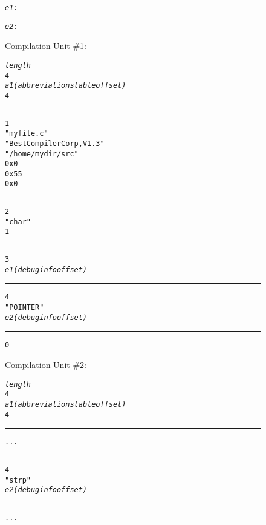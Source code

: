 \clearpage
\begin{figure}[here]
\begin{minipage}[t]{0.03\linewidth}
\flushright
\scriptsize
\begin{alltt}




















\textit{e1:}




\textit{e2:}
\end{alltt}
\end{minipage}
%
\begin{minipage}[t]{0.38\linewidth}
\centering
Compilation Unit \#1: 
\begin{framed}
\scriptsize
\begin{alltt}
\textit{length}
4
\textit{a1 (abbreviations table offset)}
4
\vspace{0.01cm}
\hrule
1
"myfile.c"
"Best Compiler Corp, V1.3"
"/home/mydir/src"
0x0
0x55
0x0
\vspace{0.01cm}
\hrule
2
"char"
1
\vspace{0.01cm}
\hrule
3
\textit{e1  (debug info offset)}
\vspace{0.01cm}
\hrule
4
"POINTER"
\textit{e2  (debug info offset)}
\vspace{0.01cm}
\hrule
0
\end{alltt}
%
%
\end{framed}
Compilation Unit \#2: 
\begin{framed}
\scriptsize
\begin{alltt}
\textit{length}
4
\textit{a1 (abbreviations table offset)}
4
\vspace{0.01cm}
\hrule
...
\vspace{0.01cm}
\hrule
4
"strp"
\textit{e2  (debug info offset)}
\vspace{0.01cm}
\hrule
...
\end{alltt}
%
%
\end{framed}
\end{minipage}
\hfill 
\begin{minipage}[t]{0.03\linewidth}
\flushright
\scriptsize
\begin{alltt}






\end{alltt}
\end{minipage}
\end{figure}
